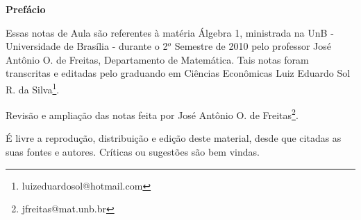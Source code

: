 \begin{center}
\Huge \textbf{Prefácio}
\end{center}

Essas notas de Aula são referentes à matéria Álgebra 1,
ministrada na UnB - Universidade de Brasília - durante o 2$^o$ Semestre de 2010
pelo professor José Antônio O. de Freitas, Departamento de Matemática. Tais
notas foram transcritas e editadas pelo graduando em Ciências Econômicas
Luiz Eduardo Sol R. da Silva\footnote{luizeduardosol@hotmail.com}.

Revisão e ampliação das notas feita por José Antônio O. de Freitas\footnote{jfreitas@mat.unb.br}.


É livre a reprodução, distribuição e edição deste material, desde que citadas as suas fontes e autores. Críticas ou sugestões são bem vindas.
\vspace{20cm}







